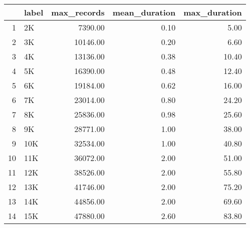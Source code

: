 \begin{table}[ht]
\centering
\begin{tabular}{rlrrr}
  \hline
 & label & max\_records & mean\_duration & max\_duration \\ 
  \hline
1 & 2K & 7390.00 & 0.10 & 5.00 \\ 
  2 & 3K & 10146.00 & 0.20 & 6.60 \\ 
  3 & 4K & 13136.00 & 0.38 & 10.40 \\ 
  4 & 5K & 16390.00 & 0.48 & 12.40 \\ 
  5 & 6K & 19184.00 & 0.62 & 16.00 \\ 
  6 & 7K & 23014.00 & 0.80 & 24.20 \\ 
  7 & 8K & 25836.00 & 0.98 & 25.60 \\ 
  8 & 9K & 28771.00 & 1.00 & 38.00 \\ 
  9 & 10K & 32534.00 & 1.00 & 40.80 \\ 
  10 & 11K & 36072.00 & 2.00 & 51.00 \\ 
  11 & 12K & 38526.00 & 2.00 & 55.80 \\ 
  12 & 13K & 41746.00 & 2.00 & 75.20 \\ 
  13 & 14K & 44856.00 & 2.00 & 69.60 \\ 
  14 & 15K & 47880.00 & 2.60 & 83.80 \\ 
   \hline
\end{tabular}
\end{table}
